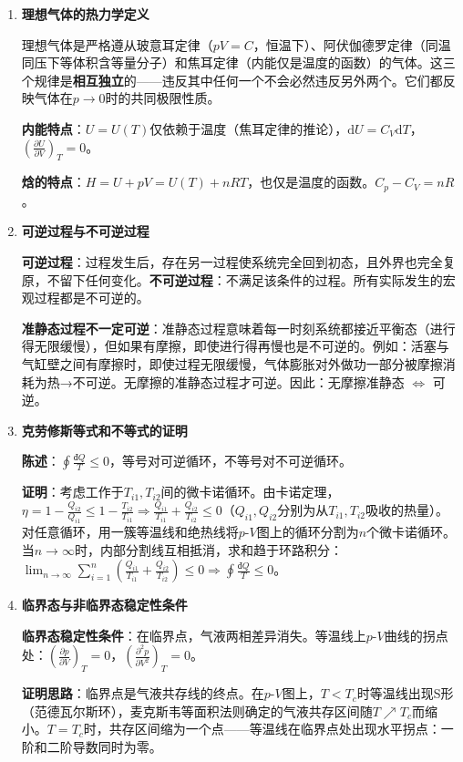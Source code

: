 \documentclass[12pt,a4paper,fontset=mac]{ctexart}
\newcommand{\dd}{\mathrm{d}}
\newcommand{\đ}{\mathrm{đ}}
\begin{document}
\begin{enumerate}

\item \textbf{理想气体的热力学定义}

理想气体是严格遵从玻意耳定律（$pV=C$，恒温下）、阿伏伽德罗定律（同温同压下等体积含等量分子）和焦耳定律（内能仅是温度的函数）的气体。这三个规律是\textbf{相互独立}的——违反其中任何一个不会必然违反另外两个。它们都反映气体在$p\to0$时的共同极限性质。

\textbf{内能特点}：$U=U(T)$仅依赖于温度（焦耳定律的推论），$\dd U=C_V\dd T$，$\left(\frac{\partial U}{\partial V}\right)_T=0$。

\textbf{焓的特点}：$H=U+pV=U(T)+nRT$，也仅是温度的函数。$C_p-C_V=nR$。

\item \textbf{可逆过程与不可逆过程}

\textbf{可逆过程}：过程发生后，存在另一过程使系统完全回到初态，且外界也完全复原，不留下任何变化。\textbf{不可逆过程}：不满足该条件的过程。所有实际发生的宏观过程都是不可逆的。

\textbf{准静态过程不一定可逆}：准静态过程意味着每一时刻系统都接近平衡态（进行得无限缓慢），但如果有摩擦，即使进行得再慢也是不可逆的。例如：活塞与气缸壁之间有摩擦时，即使过程无限缓慢，气体膨胀对外做功一部分被摩擦消耗为热→不可逆。无摩擦的准静态过程才可逆。因此：无摩擦准静态 $\Longleftrightarrow$ 可逆。

\item \textbf{克劳修斯等式和不等式的证明}

\textbf{陈述}：$\oint\frac{\đ Q}{T}\le0$，等号对可逆循环，不等号对不可逆循环。

\textbf{证明}：考虑工作于$T_{i1},T_{i2}$间的微卡诺循环。由卡诺定理，$\eta=1-\frac{Q_{i2}}{Q_{i1}}\le 1-\frac{T_{i2}}{T_{i1}}\Rightarrow \frac{Q_{i1}}{T_{i1}}+\frac{Q_{i2}}{T_{i2}}\le0$（$Q_{i1},Q_{i2}$分别为从$T_{i1},T_{i2}$吸收的热量）。对任意循环，用一簇等温线和绝热线将$p$-$V$图上的循环分割为$n$个微卡诺循环。当$n\to\infty$时，内部分割线互相抵消，求和趋于环路积分：$\lim_{n\to\infty}\sum_{i=1}^n(\frac{Q_{i1}}{T_{i1}}+\frac{Q_{i2}}{T_{i2}})\le0 \Rightarrow \oint\frac{\đ Q}{T}\le0$。

\item \textbf{临界态与非临界态稳定性条件}

\textbf{临界态稳定性条件}：在临界点，气液两相差异消失。等温线上$p$-$V$曲线的拐点处：$\left(\frac{\partial p}{\partial V}\right)_T=0$，$\left(\frac{\partial^2 p}{\partial V^2}\right)_T=0$。

\textbf{证明思路}：临界点是气液共存线的终点。在$p$-$V$图上，$T<T_c$时等温线出现S形（范德瓦尔斯环），麦克斯韦等面积法则确定的气液共存区间随$T\nearrow T_c$而缩小。$T=T_c$时，共存区间缩为一个点——等温线在临界点处出现水平拐点：一阶和二阶导数同时为零。


\end{enumerate}
\end{document}
